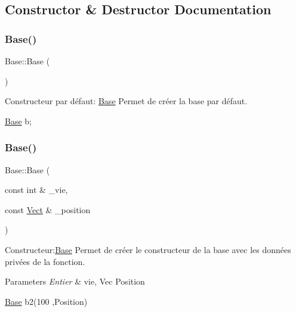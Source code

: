 \subsection{Constructor \& Destructor Documentation}
\mbox{\label{classBase_a5ffe0568374d8b9b4c4ec32953fd6453}} 
\subsubsection{\texorpdfstring{Base()}{Base()}\hspace{0.1cm}{\footnotesize\ttfamily [1/3]}}
{\footnotesize\ttfamily Base\+::\+Base (\begin{DoxyParamCaption}{ }\end{DoxyParamCaption})}



Constructeur par défaut\+: \hyperlink{classBase}{Base} Permet de créer la base par défaut. 


\begin{DoxyCode}
\hyperlink{classBase}{Base} b;
\end{DoxyCode}
 \mbox{\label{classBase_aa56feb99f89924004cbb864cce83ccc0}} 
\subsubsection{\texorpdfstring{Base()}{Base()}\hspace{0.1cm}{\footnotesize\ttfamily [2/3]}}
{\footnotesize\ttfamily Base\+::\+Base (\begin{DoxyParamCaption}\item[{const int \&}]{\+\_\+vie,  }\item[{const \hyperlink{classVect}{Vect} \&}]{\+\_\+position }\end{DoxyParamCaption})}



Constructeur\+:\hyperlink{classBase}{Base} Permet de créer le constructeur de la base avec les données privées de la fonction. 


\begin{DoxyParams}{Parameters}
{\em Entier} & vie, Vec Position 
\begin{DoxyCode}
\hyperlink{classBase}{Base} b2(100 ,Position)
\end{DoxyCode}
 \\
\hline
\end{DoxyParams}
\mbox{\label{classBase_a8520b7acb2f08e4c892a7ea3213539a7}} 
